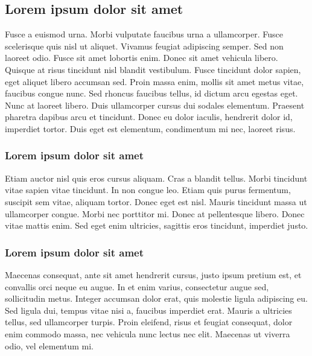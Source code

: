 \documentclass{projetofinal-dcc}
\begin{document}
\subsection{Lorem ipsum dolor sit amet}\label{sec:LABEL_CHP_1_SEC_B}
Fusce a euismod urna. Morbi vulputate faucibus urna a ullamcorper. Fusce scelerisque quis nisl ut aliquet. Vivamus feugiat adipiscing semper. Sed non laoreet odio. Fusce sit amet lobortis enim. Donec sit amet vehicula libero. Quisque at risus tincidunt nisl blandit vestibulum. Fusce tincidunt dolor sapien, eget aliquet libero accumsan sed. Proin massa enim, mollis sit amet metus vitae, faucibus congue nunc. Sed rhoncus faucibus tellus, id dictum arcu egestas eget. Nunc at laoreet libero. Duis ullamcorper cursus dui sodales elementum. Praesent pharetra dapibus arcu et tincidunt. Donec eu dolor iaculis, hendrerit dolor id, imperdiet tortor. Duis eget est elementum, condimentum mi nec, laoreet risus.

\subsubsection{Lorem ipsum dolor sit amet}\label{sec:LABEL_CHP_1_SEC_C}
Etiam auctor nisl quis eros cursus aliquam. Cras a blandit tellus. Morbi tincidunt vitae sapien vitae tincidunt. In non congue leo. Etiam quis purus fermentum, suscipit sem vitae, aliquam tortor. Donec eget est nisl. Mauris tincidunt massa ut ullamcorper congue. Morbi nec porttitor mi. Donec at pellentesque libero. Donec vitae mattis enim. Sed eget enim ultricies, sagittis eros tincidunt, imperdiet justo.

\subsubsection{Lorem ipsum dolor sit amet}\label{sec:LABEL_CHP_1_SEC_D}
Maecenas consequat, ante sit amet hendrerit cursus, justo ipsum pretium est, et convallis orci neque eu augue. In et enim varius, consectetur augue sed, sollicitudin metus. Integer accumsan dolor erat, quis molestie ligula adipiscing eu. Sed ligula dui, tempus vitae nisi a, faucibus imperdiet erat. Mauris a ultricies tellus, sed ullamcorper turpis. Proin eleifend, risus et feugiat consequat, dolor enim commodo massa, nec vehicula nunc lectus nec elit. Maecenas ut viverra odio, vel elementum mi.
\end{document}
